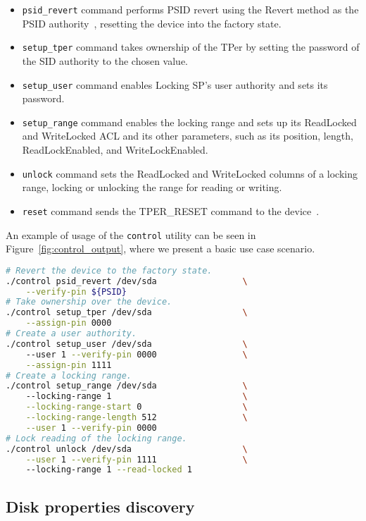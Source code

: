 \begin{itemize}
    \item \verb|psid_revert| command performs PSID revert using the Revert method as the PSID authority~\cite{tcg-psid}, resetting the device into the factory state.
    \item \verb|setup_tper| command takes ownership of the TPer by setting the password of the SID authority to the chosen value.
    \item \verb|setup_user| command enables Locking SP's user authority and sets its password.
    \item \verb|setup_range| command enables the locking range and sets up its ReadLocked and WriteLocked ACL and its other parameters, such as its position, length, ReadLockEnabled, and WriteLockEnabled.
    \item \verb|unlock| command sets the ReadLocked and WriteLocked columns of a locking range, locking or unlocking the range for reading or writing.
    \item \verb|reset| command sends the TPER\_RESET command to the device~\cite{tcg-storage-core}.
\end{itemize}

An example of usage of the \verb|control| utility can be seen in Figure~\ref{fig:control_output}, where we present a basic use case scenario.

    \begin{lstlisting}[language=bash,caption={Usage of the \texttt{control} utility},label={fig:control_output},keywordstyle=\color{black}]
# Revert the device to the factory state.
./control psid_revert /dev/sda                 \
    --verify-pin ${PSID}
# Take ownership over the device.
./control setup_tper /dev/sda                  \
    --assign-pin 0000
# Create a user authority.
./control setup_user /dev/sda                  \ 
    --user 1 --verify-pin 0000                 \
    --assign-pin 1111
# Create a locking range.
./control setup_range /dev/sda                 \ 
    --locking-range 1                          \
    --locking-range-start 0                    \
    --locking-range-length 512                 \
    --user 1 --verify-pin 0000
# Lock reading of the locking range.
./control unlock /dev/sda                      \
    --user 1 --verify-pin 1111                 \ 
    --locking-range 1 --read-locked 1
\end{lstlisting}


\subsection{Disk properties discovery}
\label{utility_discovery}

